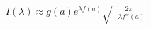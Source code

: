 \documentclass[preview]{standalone}
\begin{document}
\begin{align*}
I(\lambda) \approx g(a) \displaystyle e^{\lambda f(a)} \sqrt{\frac{2\pi}{-\lambda f''(a)}}
\end{align*}
\end{document}
